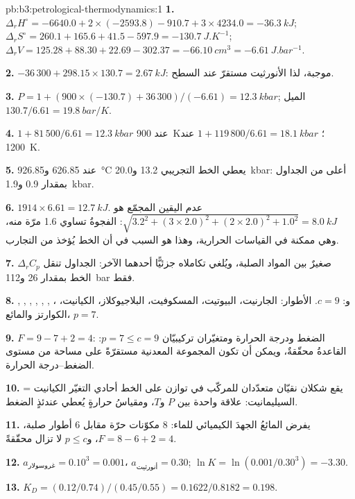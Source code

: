 \begin{solution}{pb:b3:petrological-thermodynamics:1}
\textbf{1.} $\Delta_rH^\circ = -6640.0 + 2\times(-2593.8) - 910.7 + 3\times4234.0
= \qty{-36.3}{kJ}$; $\Delta_rS^\circ = 260.1 + 165.6 + 41.5 - 597.9 =
\qty{-130.7}{J.K^{-1}}$; $\Delta_rV = 125.28 + 88.30 + 22.69 - 302.37 =
\qty{-66.10}{cm^3} = \qty{-6.61}{J.bar^{-1}}$.

\textbf{2.} $-36\,300 + 298.15\times130.7 = \qty{+2.67}{kJ}$: موجبة، لذا
الأنورثيت مستقرّ عند السطح.

\textbf{3.} $P = 1 + (900\times(-130.7) + 36\,300)/(-6.61) = \qty{12.3}{kbar}$;
الميل $130.7/6.61 = \qty{19.8}{bar/K}$.

\textbf{4.} $1 + 81\,500/6.61 = \qty{12.3}{kbar}$ عند \qty{900}{K}؛ $1 +
119\,800/6.61 = \qty{18.1}{kbar}$ عند \qty{1200}{K}.

\textbf{5.} عند 626.85 و\qty{926.85}{\celsius} يعطي الخط التجريبي
13.2 و\qty{20.0}{kbar}: أعلى من الجداول بمقدار 0.9 و\qty{1.9}{kbar}.

\textbf{6.} $1914\times6.61 = \qty{12.7}{kJ}$. عدم اليقين المجمّع هو
$\sqrt{3.2^2 + (3\times2.0)^2 + (2\times2.0)^2 + 1.0^2} = \qty{8.0}{kJ}$: الفجوةُ
تساوي 1.6 مرّة منه، وهي ممكنة في القياسات الحرارية، وهذا هو السبب في أن الخط
يُؤخذ من التجارب.

\textbf{7.} $\Delta_rC_p$ صغيرٌ بين المواد الصلبة، ويُلغي تكاملاه جزئيًّا أحدهما الآخر:
الجداول تنقل الخط بمقدار 26 و\qty{112}{bar} فقط.

\textbf{8.} , , , , , ,
،  و: $c = 9$. الأطوار: الجارنيت، البيوتيت،
المسكوفيت، البلاجيوكلاز، الكيانيت، الكوارتز والمائع، $p = 7$.

\textbf{9.} $F = 9 - 7 + 2 = 4$: الضغط ودرجة الحرارة ومتغيّران تركيبيّان
$p = 7 \le c = 9$: القاعدةُ محقّقةٌ، ويمكن أن تكون المجموعة المعدنية مستقرّةً
على مساحة من مستوى الضغط--درجة الحرارة.

\textbf{10.} يقع شكلان نقيّان متعدّدان للمركّب  في توازن على الخط أحادي التغيّر
الكيانيت = السيليمانيت: علاقة واحدة بين $P$ و$T$،
ومقياسُ حرارةٍ يُعطي عندئذٍ الضغط.

\textbf{11.} يفرض المائعُ الجهدَ الكيميائي للماء: 8 مكوّنات حرّة
مقابل 6 أطوار صلبة، $F = 8 - 6 + 2 = 4$، و$p \le c$ لا تزال
محقّقةً.

\textbf{12.} $a_{\text{غروسولار}} = 0.10^3 = 0.001$، $a_{\text{أنورثيت}} =
0.30$; $\ln K = \ln(0.001/0.30^3) = -3.30$.

\textbf{13.} $K_D = (0.12/0.74)/(0.45/0.55) = 0.1622/0.8182 = 0.198$.


\end{solution}
